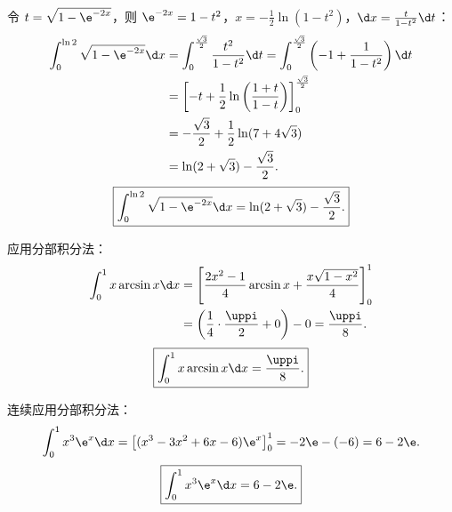 \begin{solution}

    令 $t = \sqrt{1 - \e^{-2x}}$，则 $\e^{-2x} = 1 - t^2$，$x = -\frac{1}{2}\ln(1 - t^2)$，$\d x = \frac{t}{1 - t^2}\d t$：
    \begin{equation}
        \begin{aligned}
            \int_0^{\ln 2} \sqrt{1 - \e^{-2x}} \d x & = \int_0^{\frac{\sqrt{3}}{2}} \frac{t^2}{1 - t^2} \d t = \int_0^{\frac{\sqrt{3}}{2}} \left( -1 + \frac{1}{1 - t^2} \right) \d t \\
                                                    & = \left[ -t + \frac{1}{2}\ln\left( \frac{1 + t}{1 - t} \right) \right]_0^{\frac{\sqrt{3}}{2}}                                   \\
                                                    & = -\frac{\sqrt{3}}{2} + \frac{1}{2}\ln(7 + 4\sqrt{3})                                                                           \\
                                                    & = \ln(2 + \sqrt{3}) - \frac{\sqrt{3}}{2}.
        \end{aligned}
    \end{equation}
    \begin{equation}
        \boxed{\int_0^{\ln 2} \sqrt{1 - \e^{-2x}} \d x = \ln(2 + \sqrt{3}) - \frac{\sqrt{3}}{2}.}
    \end{equation}


    应用分部积分法：
    \begin{equation}
        \begin{aligned}
            \int_0^1 x \arcsin x \d x & = \left[ \frac{2x^2 - 1}{4}\arcsin x + \frac{x\sqrt{1 - x^2}}{4} \right]_0^1  \\
                                      & = \left( \frac{1}{4} \cdot \frac{\uppi}{2} + 0 \right) - 0 = \frac{\uppi}{8}.
        \end{aligned}
    \end{equation}
    \begin{equation}
        \boxed{\int_0^1 x \arcsin x \d x = \frac{\uppi}{8}.}
    \end{equation}


    连续应用分部积分法：
    \begin{equation}
        \int_0^1 x^3 \e^x \d x = \left[ (x^3 - 3x^2 + 6x - 6)\e^x \right]_0^1 = -2\e - (-6) = 6 - 2\e.
    \end{equation}
    \begin{equation}
        \boxed{\int_0^1 x^3 \e^x \d x = 6 - 2\e.}
    \end{equation}


\end{solution}
